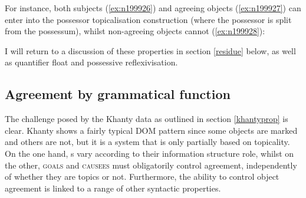 \documentclass[output=paper
,modfonts
,nonflat]{langsci/langscibook}
\begin{document}
\noindent For instance, both subjects (\ref{ex:n199926}) and agreeing objects (\ref{ex:n199927}) can enter into the possessor topicalisation construction (where the possessor is split from the possessum), whilst non-agreeing objects cannot (\ref{ex:n199928}):

\begin{exe}
\ex \citet[][346]{nikolaeva1999} \label{ex:n1999possess}
\begin{xlist}
 \label{ex:n199926}

\label{ex:n199927}

 \label{ex:n199928}
\end{xlist}
\end{exe}

\noindent I will return to a discussion of these properties in section \ref{residue} below, as well as quantifier float and possessive reflexivisation.



\subsection{Agreement by grammatical function}
\label{sec:agreementbygf}

The challenge posed by the Khanty data as outlined in section \ref{khantyprop} is clear. Khanty shows a fairly typical DOM pattern since some objects are marked and others are not, but it is a system that is only partially based on topicality. 
 On the one hand, \theme s vary according to their information structure role, whilst on the other, \textsc{goals} and \textsc{causees} must obligatorily control agreement, independently of whether they are topics or not.
Furthermore, the ability to control object agreement is linked to a range of other syntactic properties.
\end{document}
